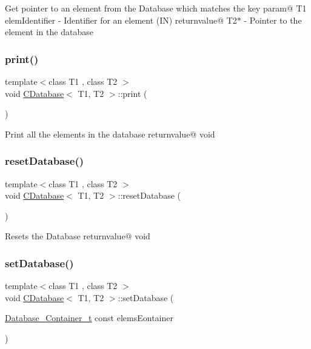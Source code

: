 Get pointer to an element from the Database which matches the key param@ T1 elem\+Identifier -\/ Identifier for an element (IN) returnvalue@ T2$\ast$ -\/ Pointer to the element in the database \mbox{\label{classCDatabase_aeaff36fd440603cb8308676c7e4eb296}} 
\subsubsection{\texorpdfstring{print()}{print()}}
{\footnotesize\ttfamily template$<$class T1 , class T2 $>$ \\
void \hyperlink{classCDatabase}{C\+Database}$<$ T1, T2 $>$\+::print (\begin{DoxyParamCaption}{ }\end{DoxyParamCaption})}

Print all the elements in the database returnvalue@ void \mbox{\label{classCDatabase_a96f398964530b48ad7fc63c05783369f}} 
\subsubsection{\texorpdfstring{reset\+Database()}{resetDatabase()}}
{\footnotesize\ttfamily template$<$class T1 , class T2 $>$ \\
void \hyperlink{classCDatabase}{C\+Database}$<$ T1, T2 $>$\+::reset\+Database (\begin{DoxyParamCaption}{ }\end{DoxyParamCaption})}

Resets the Database returnvalue@ void \mbox{\label{classCDatabase_a695c6bbbf0fc27a07cd520a5eda81128}} 
\subsubsection{\texorpdfstring{set\+Database()}{setDatabase()}}
{\footnotesize\ttfamily template$<$class T1 , class T2 $>$ \\
void \hyperlink{classCDatabase}{C\+Database}$<$ T1, T2 $>$\+::set\+Database (\begin{DoxyParamCaption}\item[{\hyperlink{classCDatabase_ac20411b7c5997877aebb46d0bd3a8461}{Database\+\_\+\+Container\+\_\+t} const}]{elems\+Eontainer }\end{DoxyParamCaption})}

